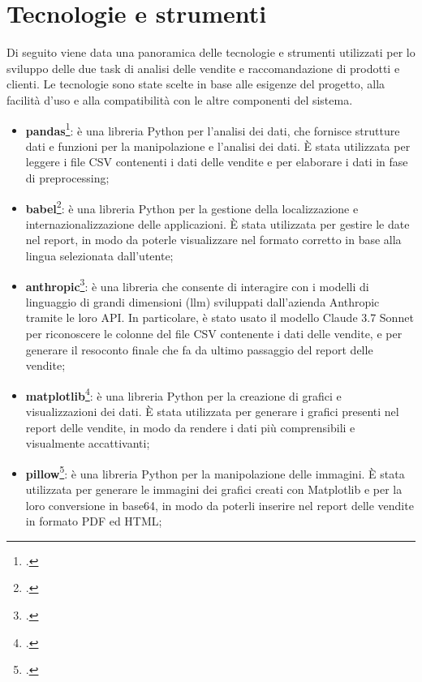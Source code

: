 \section{Tecnologie e strumenti}
\label{sec:tecnologie-strumenti}

Di seguito viene data una panoramica delle tecnologie e strumenti utilizzati per lo sviluppo delle due task di analisi delle vendite e raccomandazione di prodotti e clienti. Le tecnologie sono state scelte in base alle esigenze del progetto, alla facilità d'uso e alla compatibilità con le altre componenti del sistema.

\begin{itemize}
    \item \textbf{\gls{pandas}}\footcite{site:pandas}: è una libreria Python per l'analisi dei dati, che fornisce strutture dati e funzioni per la manipolazione e l'analisi dei dati. È stata utilizzata per leggere i file CSV contenenti i dati delle vendite e per elaborare i dati in fase di preprocessing;
    
    \item \textbf{\gls{babel}}\footcite{site:babel}: è una libreria Python per la gestione della localizzazione e internazionalizzazione delle applicazioni. È stata utilizzata per gestire le date nel report, in modo da poterle visualizzare nel formato corretto in base alla lingua selezionata dall'utente;
    
    \item \textbf{\gls{anthropic}}\footcite{site:anthropic}: è una libreria che consente di interagire con i modelli di linguaggio di grandi dimensioni (\gls{llm}) sviluppati dall'azienda Anthropic tramite le loro API. In particolare, è stato usato il modello Claude 3.7 Sonnet per riconoscere le colonne del file CSV contenente i dati delle vendite, e per generare il resoconto finale che fa da ultimo passaggio del report delle vendite;
    
    \item \textbf{\gls{matplotlib}}\footcite{site:matplotlib}: è una libreria Python per la creazione di grafici e visualizzazioni dei dati. È stata utilizzata per generare i grafici presenti nel report delle vendite, in modo da rendere i dati più comprensibili e visualmente accattivanti;
    
    \item \textbf{\gls{pillow}}\footcite{site:pillow}: è una libreria Python per la manipolazione delle immagini. È stata utilizzata per generare le immagini dei grafici creati con Matplotlib e per la loro conversione in \gls{base64}, in modo da poterli inserire nel report delle vendite in formato PDF ed HTML;
    

\end{itemize}
